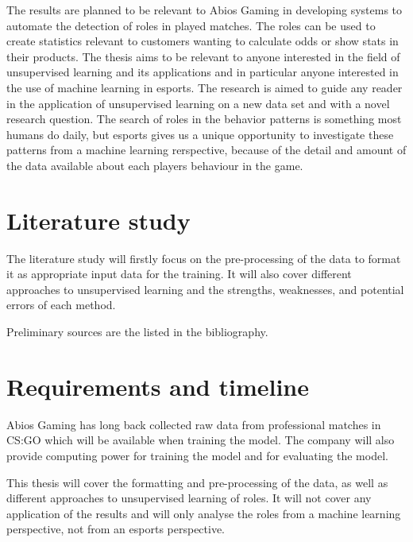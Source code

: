 \documentclass{article}
\begin{document}
The results are planned to be relevant to Abios Gaming in developing systems to automate the detection of roles in played matches. The roles can be used to create statistics relevant to customers wanting to calculate odds or show stats in their products.
The thesis aims to be relevant to anyone interested in the field of unsupervised learning and its applications and in particular anyone interested in the use of machine learning in esports. The research is aimed to guide any reader in the application of unsupervised learning on a new data set and with a novel research question. The search of roles in the behavior patterns is something most humans do daily, but esports gives us a unique opportunity to investigate these patterns from a machine learning rerspective, because of the detail and amount of the data available about each players behaviour in the game.

\section{Literature study}
The literature study will firstly focus on the pre-processing of the data to format it as appropriate input data for the training. It will also cover different approaches to unsupervised learning and the strengths, weaknesses, and potential errors of each method.

Preliminary sources are the listed in the bibliography. \cite{coates2011analysis} \cite{figueiredo2002unsupervised} \cite{hastie2009unsupervised} \cite{10.1007/978-3-319-24589-8_9}

\section{Requirements and timeline}
Abios Gaming has long back collected raw data from professional matches in CS:GO which will be available when training the model. The company will also provide computing power for training the model and for evaluating the model.

This thesis will cover the formatting and pre-processing of the data, as well as different approaches to unsupervised learning of roles. It will not cover any application of the results and will only analyse the roles from a machine learning perspective, not from an esports perspective.
\end{document}
